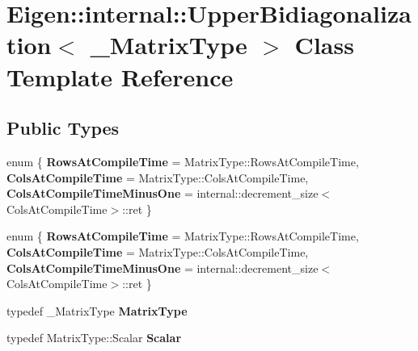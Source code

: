 \hypertarget{class_eigen_1_1internal_1_1_upper_bidiagonalization}{}\section{Eigen\+:\+:internal\+:\+:Upper\+Bidiagonalization$<$ \+\_\+\+Matrix\+Type $>$ Class Template Reference}
\label{class_eigen_1_1internal_1_1_upper_bidiagonalization}
\subsection*{Public Types}
\begin{DoxyCompactItemize}
\item 
\mbox{\label{class_eigen_1_1internal_1_1_upper_bidiagonalization_a72c2a9a7628f4e00bc24a3c9c13cc2e9}} 
enum \{ {\bfseries Rows\+At\+Compile\+Time} = Matrix\+Type\+:\+:Rows\+At\+Compile\+Time, 
{\bfseries Cols\+At\+Compile\+Time} = Matrix\+Type\+:\+:Cols\+At\+Compile\+Time, 
{\bfseries Cols\+At\+Compile\+Time\+Minus\+One} = internal\+:\+:decrement\+\_\+size$<$Cols\+At\+Compile\+Time$>$\+:\+:ret
 \}
\item 
\mbox{\label{class_eigen_1_1internal_1_1_upper_bidiagonalization_abc5baae4fca90ec4f02477795ce45bc9}} 
enum \{ {\bfseries Rows\+At\+Compile\+Time} = Matrix\+Type\+:\+:Rows\+At\+Compile\+Time, 
{\bfseries Cols\+At\+Compile\+Time} = Matrix\+Type\+:\+:Cols\+At\+Compile\+Time, 
{\bfseries Cols\+At\+Compile\+Time\+Minus\+One} = internal\+:\+:decrement\+\_\+size$<$Cols\+At\+Compile\+Time$>$\+:\+:ret
 \}
\item 
\mbox{\label{class_eigen_1_1internal_1_1_upper_bidiagonalization_a9f1c62710b34e7076b8f118f90121a80}} 
typedef \+\_\+\+Matrix\+Type {\bfseries Matrix\+Type}
\item 
\mbox{\label{class_eigen_1_1internal_1_1_upper_bidiagonalization_aea9ea6ba33f6f6e24d70beab63d88cba}} 
typedef Matrix\+Type\+::\+Scalar {\bfseries Scalar}
\item 
\mbox{\label{class_eigen_1_1internal_1_1_upper_bidiagonalization_a7ecad0d6eda591982bdb84fd96553fec}} 

\end{DoxyCompactItemize}
